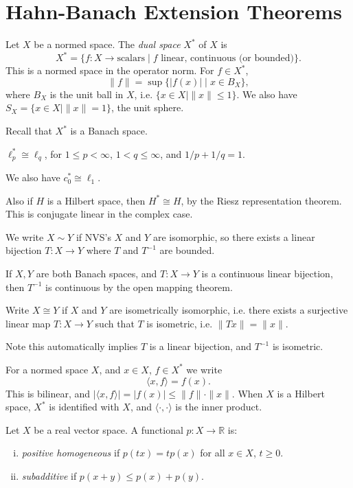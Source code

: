 \documentclass[12pt]{article}
\begin{document}
\newpage

\section{Hahn-Banach Extension Theorems}%
\label{sec:hb_ext}

Let $X$ be a normed space. The \emph{dual space} $X^\ast$ of $X$ is
\[
	X^\ast = \{f : X \to \text{scalars} \mid f \text{ linear, continuous (or bounded)}\}.
\]
This is a normed space in the operator norm. For $f \in X^\ast$,
\[
	\|f\| = \sup \{|f(x)| \mid x \in B_X\},
\]
where $B_X$ is the unit ball in $X$, i.e. $\{x \in X \mid \|x\| \leq 1\}$. We also have $S_X = \{x \in X \mid \|x\| = 1\}$, the unit sphere.

Recall that $X^\ast$ is a Banach space.

\begin{exbox}
	$\ell_p^\ast \cong \ell_q$, for $1 \leq p < \infty$, $1 < q \leq \infty$, and $1/p + 1/q = 1$.

	We also have $c_0^\ast \cong \ell_1$.

	Also if $H$ is a Hilbert space, then $H^\ast \cong H$, by the Riesz representation theorem. This is conjugate linear in the complex case.
\end{exbox}

\begin{definition}
	We write $X \sim Y$ if NVS's $X$ and $Y$ are isomorphic, so there exists a linear bijection $T : X \to Y$ where $T$ and $T^{-1}$ are bounded.

If $X, Y$ are both Banach spaces, and $T : X \to Y$ is a continuous linear bijection, then $T^{-1}$ is continuous by the open mapping theorem.

	Write $X \cong Y$ if $X$ and $Y$ are isometrically isomorphic, i.e. there exists a surjective linear map $T : X \to Y$ such that $T$ is isometric, i.e. $\|Tx\| = \|x\|$.

	Note this automatically implies $T$ is a linear bijection, and $T^{-1}$ is isometric.

	For a normed space $X$, and $x \in X$, $f \in X^\ast$ we write
	\[
	\langle x, f \rangle = f(x).
	\]
	This is bilinear, and $|\langle x, f\rangle| = |f(x)| \leq \|f\| \cdot \|x\|$. When $X$ is a Hilbert space, $X^\ast$ is identified with $X$, and $\langle \cdot, \cdot \rangle$ is the inner product.
\end{definition}

\begin{definition}
	Let $X$ be a real vector space. A functional $p : X \to \mathbb{R}$ is:
	\begin{enumerate}[(i)]
		\item \emph{positive homogeneous} if $p(tx) = tp(x)$ for all $x \in X$, $t \geq 0$.
		\item \emph{subadditive} if $p(x + y) \leq p(x) + p(y)$.
	\end{enumerate}
\end{definition}
\end{document}
